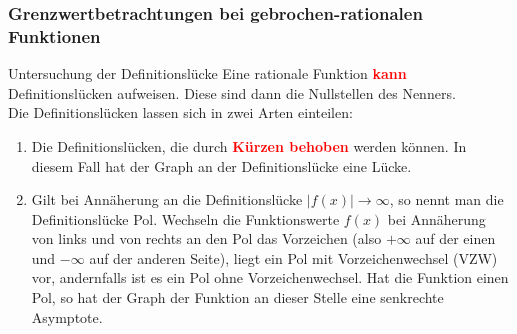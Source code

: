  \subsubsection{Grenzwertbetrachtungen bei gebrochen-rationalen Funktionen}  
 \begin{merke}{Untersuchung der Definitionslücke}{}
     Eine rationale Funktion \textcolor{red}{\textbf{kann}} Definitionslücken aufweisen. Diese sind dann die Nullstellen des Nenners.\\
     Die Definitionslücken lassen sich in zwei Arten einteilen:
     \begin{enumerate}
         \item Die Definitionslücken, die durch \textcolor{red}{\textbf{Kürzen behoben}} werden können. In diesem Fall hat der Graph an der Definitionslücke eine Lücke.      
         \item Gilt bei Annäherung an die Definitionslücke $|f(x)|\longrightarrow\infty$, so nennt man die Definitionslücke Pol. Wechseln die Funktionswerte $f(x)$ bei Annäherung von links und von rechts an den Pol das Vorzeichen (also $+\infty$ auf der einen und $-\infty$ auf der anderen Seite), liegt ein Pol mit Vorzeichenwechsel (VZW) vor, andernfalls ist es ein Pol ohne Vorzeichenwechsel. Hat die Funktion einen Pol, so hat der Graph der Funktion an dieser Stelle eine senkrechte Asymptote.
     \end{enumerate}
 \end{merke}
